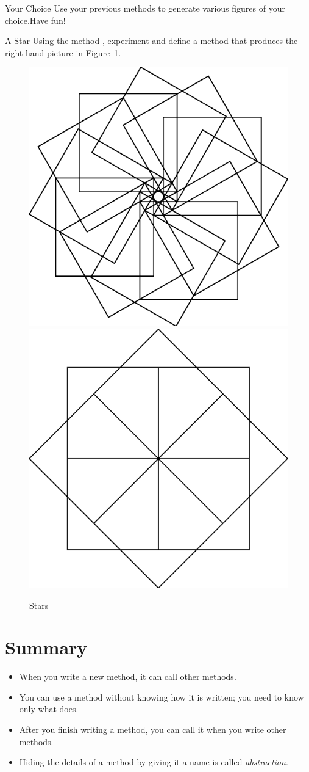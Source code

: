 \documentclass[a4paper,10pt,twoside]{book}
\begin{document}
\begin{exonofigtitle}{Your Choice}
Use your previous methods to generate various figures of your choice.Have fun! 
\end{exonofigtitle}


\begin{exonofigtitle}{A Star}
Using the method , experiment and define a method  that produces the right-hand picture in Figure~\ref{fig:132}.
\end{exonofigtitle}

\begin{figure}[h]
	\centerline{\hfill\includegraphics[width=0.45\linewidth]{comp4SquaresThree}\hfill\includegraphics[width=0.45\linewidth]{comp4SquaresFour}\hfill}
	\caption{Stars
	\label{fig:132}}
\end{figure}

\section{Summary} 

\begin{itemize}
	\item When you write a new method, it can call other methods. 
	\item You can use a method without knowing how it is written; you need to know only what does. 
	\item After you finish writing a method, you can call it when you write other methods. 
	\item Hiding the details of a method by giving it a name is called \emph{abstraction}. 
\end{itemize}

\ifx\wholebook\relax\else
    
\end{document}
